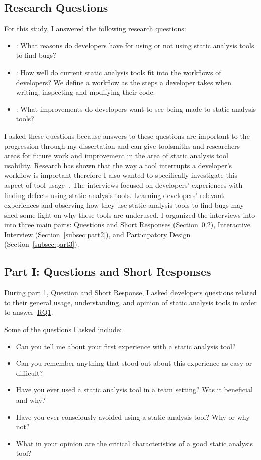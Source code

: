 \subsection{Research Questions}
\label{subsec:rq}
For this study, I answered the following research questions:
\begin{itemize}
\item [RQ\textsubscript{1}]: What reasons do developers have for using
or not using static analysis tools to find bugs?
\item [RQ\textsubscript{2}]: How well do current static analysis tools
fit into the workflows of developers? We define a workflow as the steps a
developer takes when writing, inspecting and modifying their code.
\item [RQ\textsubscript{3}]: What improvements do developers want
to see being made to static analysis tools?
\end{itemize}

I asked these questions because answers to these questions are important to the progression through my dissertation and can give toolsmiths
and researchers areas for future work and improvement in the area of static
analysis tool usability. Research has shown that the way a tool interrupts a developer's
workflow is important therefore I also wanted to specifically investigate this
aspect of tool usage~\cite{Robertson:2004:Interruption, Gluck:2007:Attentional}.
The interviews focused on developers' experiences with finding defects using
static analysis tools. Learning developers' relevant experiences and observing
how they use static analysis tools to find bugs may shed some light on why these
tools are underused. I organized the interviews into into three main
parts: Questions and Short Responses (Section~\ref{subsec:part1}), Interactive
Interview (Section~\ref{subsec:part2}), and Participatory Design
(Section~\ref{subsec:part3}).


\subsection{Part I: Questions and Short Responses}
\label{subsec:part1}
During part 1, Question and Short Response, I asked developers questions
related to their general usage, understanding, and opinion of static analysis
tools in order to answer~\hyperlink{RQ1}{RQ1}.

Some of the questions I asked include:
\begin{itemize}
\item Can you tell me about your first experience with a static analysis tool?
\item Can you remember anything that stood out about this experience as easy or difficult?
\item Have you ever used a static analysis tool in a team setting? Was it beneficial and why?
\item Have you ever consciously avoided using a static analysis tool? Why or why not?
\item What in your opinion are the critical characteristics of a good static analysis tool?
\end{itemize}

